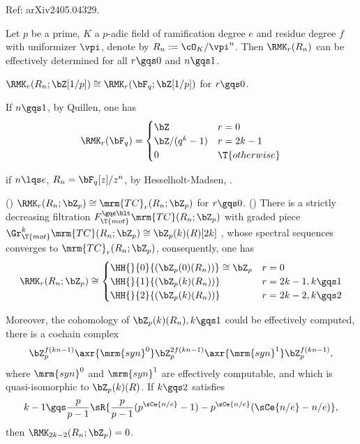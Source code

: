 \documentclass[a4paper, twoside]{article}
\begin{document}
\confighead{}{}{}

Ref: arXiv2405.04329.

\begin{stp}
    Let $p$ be a prime, $K$ a $p$-adic field of ramification degree $e$ and residue degree $f$ with uniformizer $\vpi$, denote by $R_{n}:=\cO_{K}/\vpi^{n}$. Then $\RMK_{r}(R_{n})$ can be effectively determined for all $r\gqs0$ and $n\gqs1$.

\end{stp}

 $\RMK_{r}(R_{n};\bZ[1/p])\cong \RMK_{r}(\bF_{q};\bZ[1/p])$ for $r\gqs0$.
\begin{cmt}[1]
If $n\gqs1$, by Quillen\cite{Quillen1972}, one has
\[
    \RMK_{r}(\bF_{q})=\begin{cases}
      \bZ & r = 0 \\
      \bZ/(q^{k}-1) & r = 2k-1 \\
      0 & \T{otherwise}
    \end{cases}
\]

if $n\lqs e$, $R_{n}=\bF_{q}[z]/z^{n}$, by Hesselholt-Madsen\cite{HM1997Cyclic}, .
\end{cmt}

(\cite{DGMC2013}) $\RMK_{r}(R_{n};\bZ_{p})\cong\mrm{TC}_{r}(R_{n};\bZ_{p})$ for $r\gqs0$. (\cite{BMS2019}) There is a strictly decreasing filtration $F_{\T{mot}}^{\gqs\blt}\mrm{TC}(R_{n};\bZ_{p})$ with graded piece $\Gr_{\T{mot}}^{k}\mrm{TC}(R_{n};\bZ_{p})\cong\bZ_{p}(k)(R)[2k]$ , whose spectral sequences converges to $\mrm{TC}_{r}(R_{n};\bZ_{p})$, consequently, one has
\[
    \RMK_{r}(R_{n};\bZ_{p})\cong \begin{cases}
      \HH{}{0}{(\bZ_{p}(0)(R_{n}))}\cong \bZ_{p} & r = 0 \\
      \HH{}{1}{(\bZ_{p}(k)(R_{n}))} & r=2k-1, k\gqs1 \\
      \HH{}{2}{(\bZ_{p}(k)(R_{n}))} & r=2k-2, k\gqs2
    \end{cases}
\]


Moreover, the cohomology of $\bZ_{p}(k)(R_{n}),k\gqs1$ could be effectively computed, there is a cochain complex
\[
    \bZ_{p}^{f(kn-1)}\axr{\mrm{syn}^{0}}\bZ_{p}^{2f(kn-1)}\axr{\mrm{syn}^{1}}\bZ_{p}^{f(kn-1)},
\]
where $\mrm{syn}^{0}$ and $\mrm{syn}^{1}$ are effectively computable, and which is quasi-isomorphic to $\bZ_{p}(k)(R)$. If $k\gqs2$ satisfies
\[
    k-1\gqs\frac{p}{p-1}\sR{\frac{p}{p-1}(p^{\sCe{n/e}}-1)-p^{\sCe{n/e}}(\sCe{n/e}-n/e)},
\]
then $\RMK_{2k-2}(R_{n};\bZ_{p})=0$.



\printref
\end{document}
